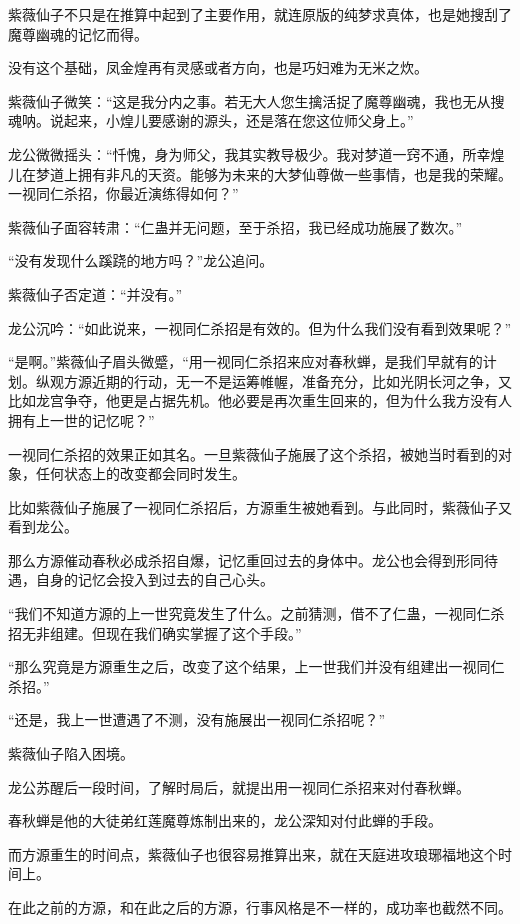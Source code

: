 \begin{this_body}
紫薇仙子不只是在推算中起到了主要作用，就连原版的纯梦求真体，也是她搜刮了魔尊幽魂的记忆而得。

没有这个基础，凤金煌再有灵感或者方向，也是巧妇难为无米之炊。

紫薇仙子微笑：“这是我分内之事。若无大人您生擒活捉了魔尊幽魂，我也无从搜魂呐。说起来，小煌儿要感谢的源头，还是落在您这位师父身上。”

龙公微微摇头：“忏愧，身为师父，我其实教导极少。我对梦道一窍不通，所幸煌儿在梦道上拥有非凡的天资。能够为未来的大梦仙尊做一些事情，也是我的荣耀。一视同仁杀招，你最近演练得如何？”

紫薇仙子面容转肃：“仁蛊并无问题，至于杀招，我已经成功施展了数次。”

“没有发现什么蹊跷的地方吗？”龙公追问。

紫薇仙子否定道：“并没有。”

龙公沉吟：“如此说来，一视同仁杀招是有效的。但为什么我们没有看到效果呢？”

“是啊。”紫薇仙子眉头微蹙，“用一视同仁杀招来应对春秋蝉，是我们早就有的计划。纵观方源近期的行动，无一不是运筹帷幄，准备充分，比如光阴长河之争，又比如龙宫争夺，他更是占据先机。他必要是再次重生回来的，但为什么我方没有人拥有上一世的记忆呢？”

一视同仁杀招的效果正如其名。一旦紫薇仙子施展了这个杀招，被她当时看到的对象，任何状态上的改变都会同时发生。

比如紫薇仙子施展了一视同仁杀招后，方源重生被她看到。与此同时，紫薇仙子又看到龙公。

那么方源催动春秋必成杀招自爆，记忆重回过去的身体中。龙公也会得到形同待遇，自身的记忆会投入到过去的自己心头。

“我们不知道方源的上一世究竟发生了什么。之前猜测，借不了仁蛊，一视同仁杀招无非组建。但现在我们确实掌握了这个手段。”

“那么究竟是方源重生之后，改变了这个结果，上一世我们并没有组建出一视同仁杀招。”

“还是，我上一世遭遇了不测，没有施展出一视同仁杀招呢？”

紫薇仙子陷入困境。

龙公苏醒后一段时间，了解时局后，就提出用一视同仁杀招来对付春秋蝉。

春秋蝉是他的大徒弟红莲魔尊炼制出来的，龙公深知对付此蝉的手段。

而方源重生的时间点，紫薇仙子也很容易推算出来，就在天庭进攻琅琊福地这个时间上。

在此之前的方源，和在此之后的方源，行事风格是不一样的，成功率也截然不同。


\end{this_body}
